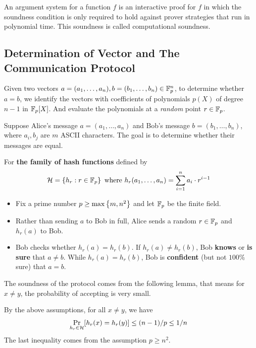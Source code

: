 \documentclass{article}
\begin{document}
\begin{boxx1}
An argument system for a function $f$ is an interactive proof for $f$ in which the soundness condition is only required to hold against prover strategies that run in polynomial time. This soundness is called computational soundness.
\end{boxx1}


\subsection{Determination of Vector and The Communication Protocol}

Given two vectors $a = (a_1, \dots, a_n), b = (b_1, \dots, b_n) \in \mathbb{F}_p^n$, to determine whether $a = b$, we identify the vectors with coefficients of polynomials $p(X)$ of degree $n-1$ in $\mathbb{F}_p[X]$. And evaluate the polynomials at a \textit{random} point $r \in \mathbb{F}_p$. 

\begin{boxx1}
Suppose Alice's message $a = (a_1, \dots, a_n)$ and Bob's message $b = (b_1, \dots, b_n)$, where $a_i, b_j$ are $m$ ASCII characters. The goal is to determine whether their messages are equal.

For \textbf{the family of hash functions} defined by
\begin{equation*}
\mathcal{H} = \left\{ h_r: r \in \mathbb{F}_p \right\} \text{ where } h_r(a_1, \dots, a_n) = \sum_{i = 1}^n a_i \cdot r^{i-1}
\end{equation*}

\begin{itemize}
\item Fix a prime number $p \geq \operatorname{max} \left\{ m, n^2 \right\}$ and let $\mathbb{F}_p$ be the finite field.
\item Rather than sending $a$ to Bob in full, Alice sends a random $r \in \mathbb{F}_p$ and $h_r(a)$ to Bob. 
\item Bob checks whether $h_r(a) = h_r(b)$. If $h_r(a) \neq h_r(b)$, Bob \textbf{knows} or \textbf{is sure} that $a \neq b$. While $h_r(a) = h_r(b)$, Bob is \textbf{confident} (but not $100 \%$ sure) that $a = b$. 
\end{itemize}

\end{boxx1}

The soundness of the protocol comes from the following lemma, that means for $x \neq y$, the probability of accepting is very small.

\begin{lemma}
By the above assumptions, for all $x \neq y$, we have
\begin{equation*}
\mathop{\operatorname{Pr}}_{h_{r} \in \mathcal{H}} [h_r(x) = h_r(y)] \leq (n - 1)/p \leq 1/n
\end{equation*}
The last inequality comes from the assumption $ p \geq n^2 $.
\end{lemma}
\end{document}

